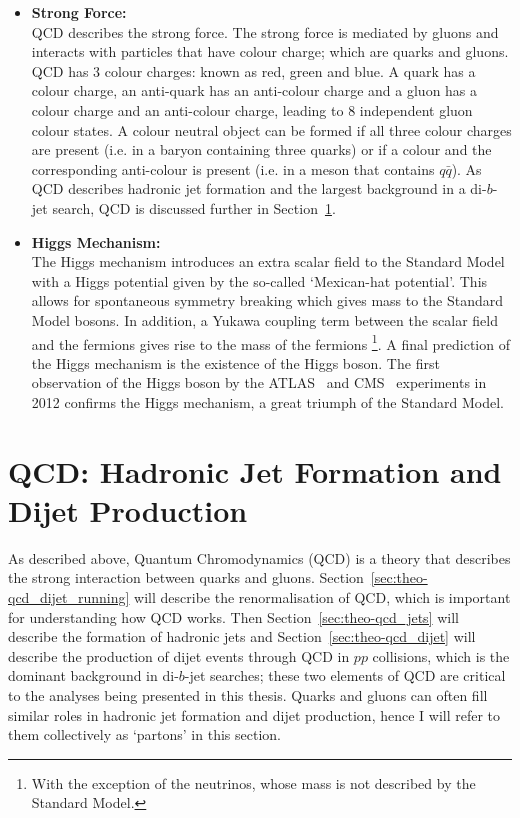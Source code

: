 \begin{itemize}[leftmargin=*]
\item\textbf{Strong Force:}\\
  QCD describes the strong force.
  The strong force is mediated by gluons 
  and interacts with particles that have colour charge; which are quarks and gluons.
  QCD has 3 colour charges: known as red, green and blue.
  A quark has a colour charge, an anti-quark has an anti-colour charge and 
  a gluon has a colour charge and an anti-colour charge, leading to 8 independent gluon colour states.
  A colour neutral object can be formed if all three colour charges are present (i.e. in a baryon containing three quarks)
  or if a colour and the corresponding anti-colour is present (i.e. in a meson that contains $q\bar{q}$).
  As QCD describes hadronic jet formation and the largest background in a di-$b$-jet search, QCD is discussed further in Section~\ref{sec:theo-qcd}.\vspace{1em}

\item\textbf{Higgs Mechanism:}\\
  The Higgs mechanism introduces an extra scalar field to the Standard Model
  with a Higgs potential given by the so-called `Mexican-hat potential'.
  This allows for spontaneous symmetry breaking which gives mass to the Standard Model bosons.
  In addition, a Yukawa coupling term between the scalar field and the fermions gives rise to the mass of the fermions
  \footnote{With the exception of the neutrinos, whose mass is not described by the Standard Model.}.
  A final prediction of the Higgs mechanism is the existence of the Higgs boson.
  The first observation of the Higgs boson by the ATLAS~\cite{theo-higgs_atlas} and CMS~\cite{theo-higgs_cms} experiments
  in 2012 confirms the Higgs mechanism, a great triumph of the Standard Model.
\end{itemize}

\section{QCD: Hadronic Jet Formation and Dijet Production}
\label{sec:theo-qcd}

As described above, Quantum Chromodynamics (QCD) is a theory that describes the strong interaction between quarks and gluons.
Section~\ref{sec:theo-qcd_dijet_running} will describe the renormalisation of QCD, which is important for understanding how QCD works.
Then Section~\ref{sec:theo-qcd_jets} will describe the formation of hadronic jets and
Section~\ref{sec:theo-qcd_dijet} will describe the production of dijet events through QCD in $pp$ collisions, which is the dominant background in di-$b$-jet searches;
these two elements of QCD are critical to the analyses being presented in this thesis.
Quarks and gluons can often fill similar roles in hadronic jet formation and dijet production, hence I will refer to them collectively as `partons' in this section.

